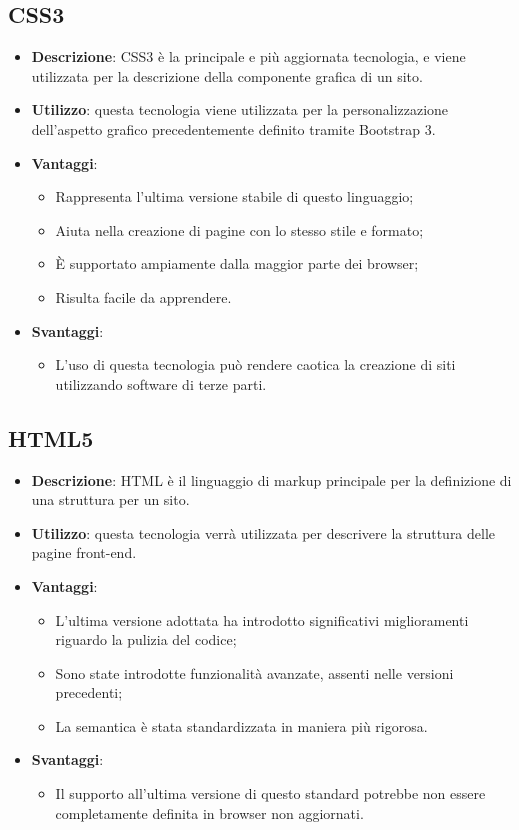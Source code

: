 \subsection{CSS3}
\begin{itemize}
	\item \textbf{Descrizione}: CSS3 è la principale e più aggiornata tecnologia, e viene utilizzata per la descrizione della componente grafica di un sito.
	\item \textbf{Utilizzo}: questa tecnologia viene utilizzata per la personalizzazione dell'aspetto grafico precedentemente definito tramite Bootstrap 3.
	\item \textbf{Vantaggi}:
	\begin{itemize}
		\item Rappresenta l'ultima versione stabile di questo linguaggio;
		\item Aiuta nella creazione di pagine con lo stesso stile e formato;
		\item \MakeUppercase{è} supportato ampiamente dalla maggior parte dei browser;
		\item Risulta facile da apprendere.
	\end{itemize}
	\item \textbf{Svantaggi}:
	\begin{itemize}
		\item L'uso di questa tecnologia può rendere caotica la creazione di siti utilizzando software di terze parti.
	\end{itemize}
\end{itemize}

\subsection{HTML5}
\begin{itemize}
	\item \textbf{Descrizione}: HTML è il linguaggio di markup principale per la definizione di una struttura per un sito.
	\item \textbf{Utilizzo}: questa tecnologia verrà utilizzata per descrivere la struttura delle pagine front-end.
	\item \textbf{Vantaggi}:
	\begin{itemize}
		\item L'ultima versione adottata ha introdotto significativi miglioramenti riguardo la pulizia del codice;
		\item Sono state introdotte funzionalità avanzate, assenti nelle versioni precedenti;
		\item La semantica è stata standardizzata in maniera più rigorosa.
	\end{itemize}
	\item \textbf{Svantaggi}:
	\begin{itemize}
		\item Il supporto all'ultima versione di questo standard potrebbe non essere completamente definita in browser non aggiornati.
	\end{itemize}
\end{itemize}

